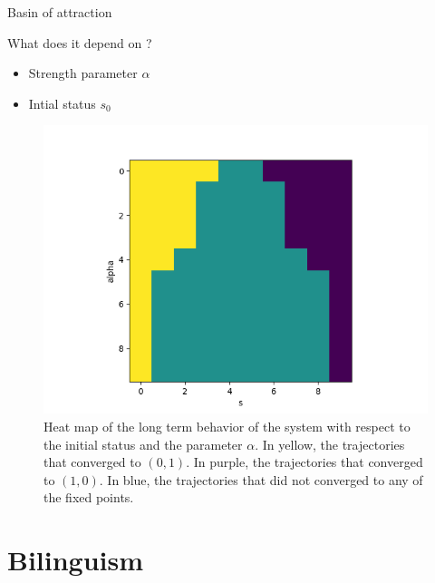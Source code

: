 \documentclass[10pt]{beamer}
\begin{document}
\begin{frame}{Basin of attraction}

\begin{alertblock}{What does it depend on ? }

\begin{itemize}
\item Strength parameter $\alpha$
\item Intial status $s_0$
\end{itemize}

\begin{figure}[H]
\centering
\includegraphics[scale=0.3]{convergence_heatmap.png}
\caption{Heat map of the long term behavior of the system with respect to the initial status and the parameter $\alpha$. In yellow, the trajectories that converged to $(0,1)$. In purple, the trajectories that converged to $(1,0)$. In blue, the trajectories that did not converged to any of the fixed points.}
\label{fig:heatmap}
\end{figure}

\end{alertblock}

\end{frame}

\section{Bilinguism}
\end{document}
